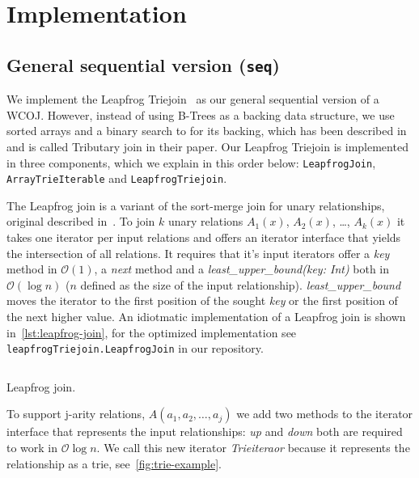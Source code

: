 \section{Implementation}\label{sec:implementation}

\subsection{General sequential version (\texttt{seq})}\label{subsec:general-sequential-versiontexttt}
We implement the Leapfrog Triejoin~\cite{leapfrog} as our general sequential version of a WCOJ.
However, instead of using B-Trees as a backing data structure, we use sorted arrays and a binary search
to for its backing, which has been described in~\cite{myria-detailed} and is called Tributary join in their paper.
Our Leapfrog Triejoin is implemented in three components, which we explain in this order below: \texttt{LeapfrogJoin}, \texttt{ArrayTrieIterable} and
\texttt{LeapfrogTriejoin}.

The Leapfrog join is a variant of the sort-merge join for unary relationships, original described in~\cite{leapfrog1,leapfrog2}. %
To join $k$ unary relations $A_1(x)$, $A_2(x)$, \dots, $A_k(x)$ it takes one iterator per input relations and offers an iterator
interface that yields the intersection of all relations.
It requires that it's input iterators offer a \textit{key} method in $\mathcal{O}(1)$, a \textit{next} method and
a \textit{least\_upper\_bound(key: Int)} both in $\mathcal{O} (\log n)$ ($n$ defined as the size of the input relationship).
\textit{least\_upper\_bound} moves the iterator to the first position of the sought \textit{key} or the first position of the
next higher value.
An idiotmatic implementation of a Leapfrog join is shown in~\cref{lst:leapfrog-join}, for the optimized implementation see
\texttt{leapfrogTriejoin.LeapfrogJoin} in our repository.  %

\begin{listing}[H]
    \inputminted{scala}{code/LeapfrogJoin.scala}
    \caption{Leapfrog join.}
    \label{lst:leapfrog-join}
\end{listing}

To support j-arity relations, $A(a_1, a_2, \dots, a_j)$ we add two methods to the iterator interface that represents the input
relationships: \textit{up} and \textit{down} both are required to work in $\mathcal{O} \log n$.
We call this new iterator \textit{Trieiteraor} because it represents the relationship as a trie, see~\cref{fig:trie-example}.

